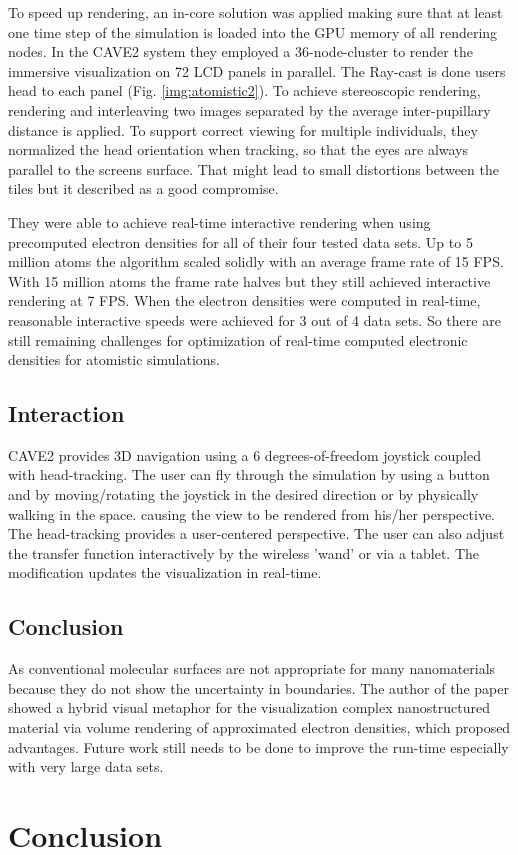 \documentclass[10pt,twocolumn,letterpaper]{article}
\begin{document}
\setlength{\parindent}{1pc}To speed up rendering, an in-core solution was applied making sure that at least one time step of the simulation is loaded into the GPU memory of all rendering nodes. In the CAVE2 \cite{febretti2013cave2} system they employed a 36-node-cluster to render the immersive visualization on 72 LCD panels in parallel. The Ray-cast is done users head to each panel (Fig. \ref{img:atomistic2}). To achieve stereoscopic rendering, rendering and interleaving two images separated by the average inter-pupillary distance is applied. To support correct viewing for multiple individuals, they normalized the head orientation when tracking, so that the eyes are always parallel to the screens surface. That might lead to small distortions between the tiles but it described as a good compromise. 

\setlength{\parindent}{1pc}They were able to achieve real-time interactive rendering when using precomputed electron densities for all of their four tested data sets. Up to 5 million atoms the algorithm scaled solidly with an average frame rate of 15 FPS. With 15 million atoms the frame rate halves but they still achieved interactive rendering at 7 FPS. When the electron densities were computed in real-time, reasonable interactive speeds were achieved for 3 out of 4 data sets. So there are still remaining challenges for optimization of real-time computed electronic densities for atomistic simulations.

\subsection{Interaction}
CAVE2 \cite{febretti2013cave2} provides 3D navigation using a 6 degrees-of-freedom joystick coupled with head-tracking. The user can fly through the simulation by using a button and by moving/rotating the joystick in the desired direction or by physically walking in the space. causing the view to be rendered from his/her perspective. The head-tracking provides a user-centered perspective. The user can also adjust the transfer function interactively by the wireless 'wand' or via a tablet. The modification updates the visualization in real-time.

\subsection{Conclusion}
As conventional molecular surfaces are not appropriate for many nanomaterials because they do not show the uncertainty in boundaries. The author of the paper showed a hybrid visual metaphor for the visualization complex nanostructured material via volume rendering of approximated electron densities, which proposed advantages. Future work still needs to be done to improve the run-time especially with very large data sets.

\section{Conclusion}

{\small


}
\end{document}

